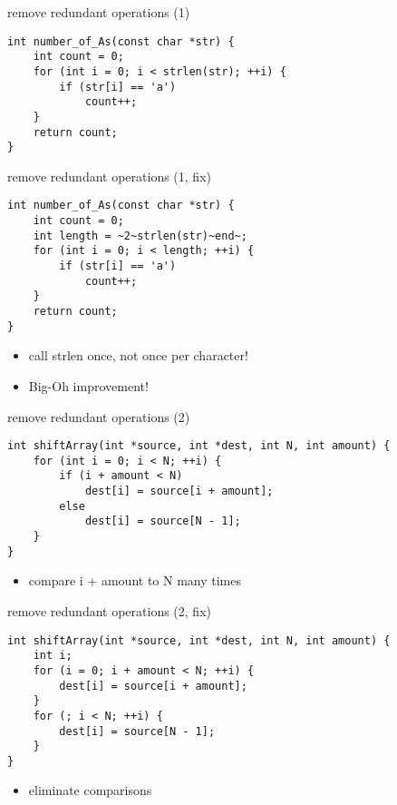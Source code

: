 \begin{frame}[fragile,label=redundCalc1]{remove redundant operations (1)}
    \lstset{language=C,style=small}
\begin{lstlisting}
int number_of_As(const char *str) {
    int count = 0;
    for (int i = 0; i < strlen(str); ++i) {
        if (str[i] == 'a')
            count++;
    }
    return count;
}
\end{lstlisting}
\end{frame}

\begin{frame}[fragile,label=redundCalc1Fix]{remove redundant operations (1, fix)}
\begin{lstlisting}
int number_of_As(const char *str) {
    int count = 0;
    int length = ~2~strlen(str)~end~;
    for (int i = 0; i < length; ++i) {
        if (str[i] == 'a')
            count++;
    }
    return count;
}
\end{lstlisting}
    \begin{itemize}
        \item call strlen once, not once per character!
        \item Big-Oh improvement!
    \end{itemize}
\end{frame}

\begin{frame}[fragile,label=removeRedundant2]{remove redundant operations (2)}
\begin{lstlisting}
int shiftArray(int *source, int *dest, int N, int amount) {
    for (int i = 0; i < N; ++i) {
        if (i + amount < N)
            dest[i] = source[i + amount];
        else
            dest[i] = source[N - 1];
    }
}
\end{lstlisting}
    \begin{itemize}
    \item compare i + amount to N many times
    \end{itemize}
\end{frame}

\begin{frame}[fragile,label=removeRedundant2Fix]{remove redundant operations (2, fix)}
\begin{lstlisting}
int shiftArray(int *source, int *dest, int N, int amount) {
    int i;
    for (i = 0; i + amount < N; ++i) {
        dest[i] = source[i + amount];
    }
    for (; i < N; ++i) {
        dest[i] = source[N - 1];
    }
}
\end{lstlisting}
    \begin{itemize}
    \item eliminate comparisons
    \end{itemize}
\end{frame}
